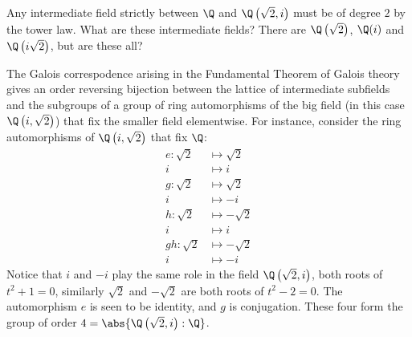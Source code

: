 \documentclass{article}
\begin{document}
Any intermediate field strictly between $\Q$ and $\Q\left(\sqrt{2}, i\right)$ must be of degree $2$ by the tower law.
What are these intermediate fields? There are $\Q\left(\sqrt{2}\right)$, $\Q(i)$ and $\Q\left(i\sqrt{2}\right)$, but are these all?

The Galois correspodence arising in the Fundamental Theorem of Galois theory gives an order reversing bijection between the lattice of intermediate subfields and the subgroups of a group of ring automorphisms of the big field (in this case $\Q\left(i, \sqrt{2}\right)$) that fix the smaller field elementwise.
For instance, consider the ring automorphisms of $\Q\left(i, \sqrt{2}\right)$ that fix $\Q$:
\begin{align*}
    e : \sqrt{2} &\mapsto \sqrt{2} \\
               i &\mapsto i \\
    g : \sqrt{2} &\mapsto \sqrt{2} \\
               i &\mapsto -i \\
    h : \sqrt{2} &\mapsto -\sqrt{2} \\
               i &\mapsto i \\
    gh: \sqrt{2} &\mapsto -\sqrt{2} \\
               i &\mapsto -i
\end{align*}
Notice that $i$ and $-i$ play the same role in the field $\Q\left(\sqrt{2}, i\right)$, both roots of $t^2 + 1 = 0$, similarly $\sqrt{2}$ and $-\sqrt{2}$ are both roots of $t^2 - 2 = 0$.  The automorphism $e$ is seen to be identity, and $g$ is conjugation.
These four form the group of order $4 = \abs{\Q\left(\sqrt{2}, i\right) : \Q}$.

\begin{center}
\end{center}
\end{document}
